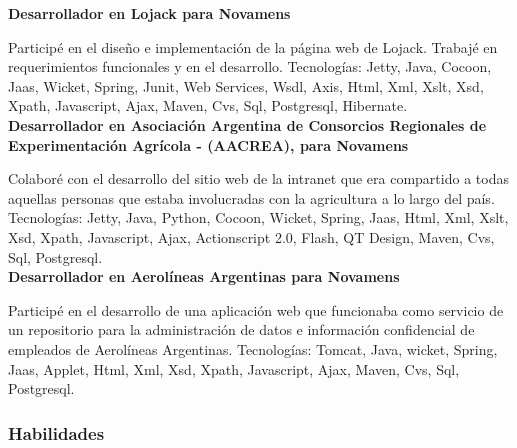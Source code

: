 \documentclass[a4paper,11pt]{article}
\begin{document}
\noindent \textbf{Desarrollador en Lojack para Novamens}

\noindent Participé en el diseño e implementación de la página web de Lojack.
Trabajé en requerimientos funcionales y en el desarrollo.  Tecnologías: Jetty,
Java, Cocoon, Jaas, Wicket, Spring, Junit, Web Services, Wsdl, Axis, Html, Xml,
Xslt, Xsd, Xpath, Javascript, Ajax, Maven, Cvs, Sql, Postgresql, Hibernate. \\
 
\noindent \textbf{Desarrollador en Asociación Argentina de Consorcios
Regionales de Experimentación Agrícola - (AACREA), para Novamens}

\noindent Colaboré con el desarrollo del sitio web de la intranet que era
compartido a todas aquellas personas que estaba involucradas con la agricultura
a lo largo del país.  Tecnologías: Jetty, Java, Python, Cocoon, Wicket, Spring,
Jaas, Html, Xml, Xslt, Xsd, Xpath, Javascript, Ajax, Actionscript 2.0, Flash,
QT Design, Maven, Cvs, Sql, Postgresql. \\
 
\noindent \textbf{Desarrollador en Aerolíneas Argentinas para Novamens}

\noindent Participé en el desarrollo de una aplicación web que funcionaba como
servicio de un repositorio para la administración de datos e información
confidencial de empleados de Aerolíneas Argentinas.  Tecnologías: Tomcat, Java,
wicket, Spring, Jaas, Applet, Html, Xml, Xsd, Xpath, Javascript, Ajax, Maven,
Cvs, Sql, Postgresql. \\

\subsubsection{Habilidades}
\end{document}
